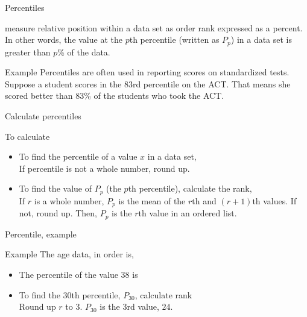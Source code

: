 \documentclass[xcolor=table, aspectratio=169, bigger]{beamer}
\begin{document}
\begin{frame}{Percentiles}
\begin{block}{}
 measure relative position within a data set as order rank expressed as a percent. In other words, the value at the $p$th percentile (written as $P_p$) in a data set is greater than $p$\% of the data.
\end{block}

\pause

\begin{exampleblock}{Example}
Percentiles are often used in reporting scores on standardized tests.\\
\medskip
Suppose a student scores in the 83rd percentile on the ACT. That means she scored better than 83\% of the students who took the ACT.
\end{exampleblock}
\end{frame}

\begin{frame}{Calculate percentiles}
\begin{block}{To calculate}
\begin{itemize}
\item To find the percentile of a value $x$ in a data set,\\
\smallskip
{}
\medskip
If percentile is not a whole number, round up.
\medskip
\pause\item To find the value of $P_p$ (the $p$th percentile), calculate the rank,\\
\smallskip
{}
\medskip
If $r$ is a whole number, $P_p$ is the mean of the $r$th and $(r+1)$th values. If not, round up. Then, $P_p$ is the $r$th value in an ordered list.
\end{itemize}
\end{block}
\end{frame}

\begin{frame}{Percentile, example}
\begin{exampleblock}{Example}
The age data, in order is, \\
\smallskip
{}

\begin{itemize}
\pause
\item The percentile of the value 38 is\\
\smallskip
{} 
\medskip
\pause\item To find the 30th percentile, $P_{30}$, calculate rank\\
\smallskip
{}
\medskip
Round up $r$ to $3$. $P_{30}$ is the 3rd value, $24$.
\end{itemize}
\end{exampleblock}
\end{frame}
\end{document}
